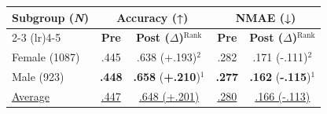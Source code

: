 \begin{tabular}{@{} l | c c | c c @{}}
\toprule
\multirow{2}{*}{\textbf{Subgroup (\textbf{\textit{N}})}} & \multicolumn{2}{c|}{\textbf{Accuracy (↑)}} & \multicolumn{2}{c}{\textbf{NMAE (↓)}} \\
\cmidrule(lr){2-3} \cmidrule(lr){4-5}
& \textbf{Pre} & \textbf{Post ($\Delta$)}$^{\text{Rank}}$ & \textbf{Pre} & \textbf{Post ($\Delta$)}$^{\text{Rank}}$ \\
\midrule
Female (1087) & .445 & .638 (+.193)$^{2}$ & .282 & .171 (-.111)$^{2}$ \\
Male (923) & \textbf{.448} & \textbf{.658} (\textbf{+.210})$^{1}$ & \textbf{.277} & \textbf{.162} (\textbf{-.115})$^{1}$ \\
\midrule
\underline{Average} & \underline{.447} & \underline{.648 (+.201)} & \underline{.280} & \underline{.166 (-.113)} \\
\bottomrule
\end{tabular}

